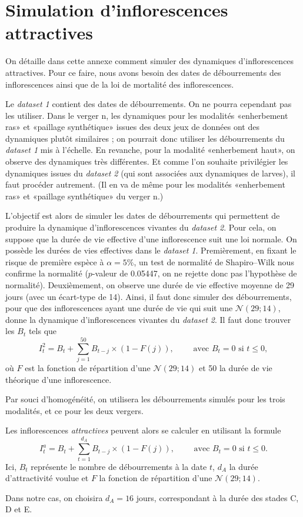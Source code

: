 \chapter{Simulation d'inflorescences attractives} 
\label{chap:deb}

On détaille dans cette annexe comment simuler des dynamiques d'inflorescences attractives.
Pour ce faire, nous avons besoin des dates de débourrements des inflorescences ainsi que de la loi de mortalité des inflorescences.


Le \emph{dataset 1} contient des dates de débourrements. On ne pourra cependant pas les utiliser.
Dans le verger n, les dynamiques pour les modalités «enherbement ras» et «paillage synthétique» issues des deux jeux de données ont des dynamiques plutôt similaires ; on pourrait donc utiliser les débourrements du \emph{dataset 1} mis à l'échelle.
En revanche, pour la modalité «enherbement haut», on observe des dynamiques très différentes. 
Et comme l'on souhaite privilégier les dynamiques issues du \emph{dataset 2} (qui sont associées aux dynamiques de larves), il faut procéder autrement.
(Il en va de même pour les modalités «enherbement ras» et «paillage synthétique» du verger n.)
 
L'objectif est alors de simuler les dates de débourrements qui permettent de produire la dynamique d'inflorescences vivantes du \emph{dataset 2}.
Pour cela, on suppose que la durée de vie effective d'une inflorescence suit une loi normale.
On possède les durées de vies effectives dans le \emph{dataset 1}.
Premièrement, en fixant le risque de première espèce à $\alpha = 5\%$, un test de normalité de Shapiro--Wilk nous confirme la normalité ($p$-valeur de 0.05447, on ne rejette donc pas l'hypothèse de normalité).
Deuxièmement, on observe une durée de vie effective moyenne de 29 jours (avec un écart-type de 14).
Ainsi, il faut donc simuler des débourrements, pour que des inflorescences ayant une durée de vie qui suit une $\mathcal{N}\left( 29; 14 \right)$, donne la dynamique d'inflorescences vivantes du \emph{dataset 2}.
Il faut donc trouver les $B_t$ tels que 
\[
I_{t}^{2} = B_t + \sum_{j = 1}^{50} B_{t - j} \times \left( 1 - F\left( j \right) \right),  \qquad \text{ avec } B_{t} = 0 \text{ si } t \leq 0,
\]
où $F$ est la fonction de répartition d'une $\mathcal{N}\left( 29;14 \right)$ et 50 la durée de vie théorique d'une inflorescence.
 
Par souci d'homogénéité, on utilisera les débourrements simulés pour les trois modalités, et ce pour les deux vergers.



Les inflorescences \emph{attractives} peuvent alors se calculer en utilisant la formule
\[
I_{t}^{a} = B_t + \sum_{t = 1}^{d_A} B_{t-j} \times \left( 1 - F(j) \right), \qquad \text{ avec } B_{t} = 0 \text{ si } t \leq 0. 
\]
Ici, $B_t$ représente le nombre de débourrements à la date $t$, $d_A$ la durée d'attractivité voulue et $F$ la fonction de répartition d'une $\mathcal{N}\left( 29; 14 \right)$.

Dans notre cas, on choisira $d_A = 16$ jours, correspondant à la durée des stades C, D et E.

